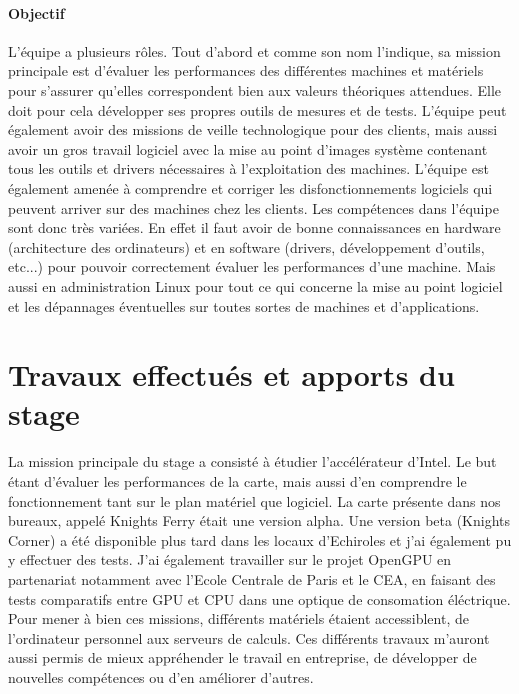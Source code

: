 \documentclass[11pt]{article}
\begin{document}
	\subsection{Objectif}
	L'équipe a plusieurs rôles. Tout d'abord et comme son nom l'indique, sa mission principale est d'évaluer les performances des différentes machines 
	et matériels pour s'assurer qu'elles correspondent bien aux valeurs théoriques attendues. Elle doit pour cela développer ses propres outils de 
	mesures et de tests. L'équipe peut également avoir des missions de veille technologique pour des clients, mais aussi avoir un gros travail logiciel 
	avec la mise au point d'images système contenant tous les outils et drivers nécessaires à l'exploitation des machines. L'équipe est également 
	amenée à comprendre et corriger les disfonctionnements logiciels qui peuvent arriver sur des machines chez les clients.\newline
	Les compétences dans l'équipe sont donc très variées. En effet il faut avoir de bonne connaissances en hardware (architecture des ordinateurs) et 
	en software (drivers, développement d'outils, etc...) pour pouvoir correctement évaluer les performances d'une machine. Mais aussi en administration 
	Linux pour tout ce qui concerne la mise au point logiciel et les dépannages éventuelles sur toutes sortes de machines et d'applications.
\newpage
{}
\part{Travaux effectués et apports du stage}
La mission principale du stage a consisté à étudier l'accélérateur d'Intel. Le but étant d'évaluer les performances de la carte,
mais aussi d'en comprendre le fonctionnement tant sur le plan matériel que logiciel. La carte présente dans nos bureaux,
appelé Knights Ferry était une version alpha. Une version beta (Knights Corner) a été disponible plus tard dans les locaux
d'Echiroles et j'ai également pu y effectuer des tests. \newline
J'ai également travailler sur le projet OpenGPU en partenariat notamment avec l'Ecole Centrale de Paris et le CEA,
en faisant des tests comparatifs entre GPU et CPU dans une optique de consomation éléctrique. \newline
Pour mener à bien ces missions, différents matériels étaient accessiblent, de l'ordinateur personnel aux serveurs de calculs.
Ces différents travaux m'auront aussi permis de mieux appréhender le travail en entreprise, de développer de nouvelles compétences 
ou d'en améliorer d'autres.
\end{document}
